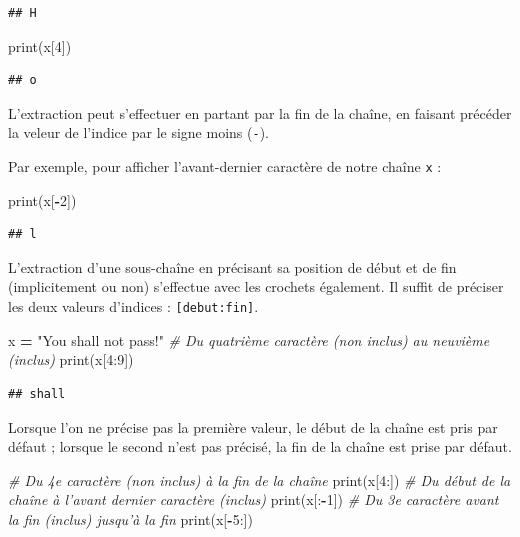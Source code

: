 \documentclass[12pt,]{book}
\newenvironment{Shaded}{\begin{snugshade}}{\end{snugshade}}
\newcommand{\DecValTok}[1]{\textcolor[rgb]{0.00,0.00,0.81}{#1}}
\newcommand{\StringTok}[1]{\textcolor[rgb]{0.31,0.60,0.02}{#1}}
\newcommand{\CommentTok}[1]{\textcolor[rgb]{0.56,0.35,0.01}{\textit{#1}}}
\newcommand{\OperatorTok}[1]{\textcolor[rgb]{0.81,0.36,0.00}{\textbf{#1}}}
\newcommand{\BuiltInTok}[1]{#1}
\newcommand{\NormalTok}[1]{#1}
\numberwithin{equation}{section}
\numberwithin{countremarque}{section}
\begin{document}
\begin{lstlisting}
## H
\end{lstlisting}

\begin{Shaded}
\begin{Highlighting}[]
\BuiltInTok{print}\NormalTok{(x[}\DecValTok{4}\NormalTok{])}
\end{Highlighting}
\end{Shaded}

\begin{lstlisting}
## o
\end{lstlisting}

L'extraction peut s'effectuer en partant par la fin de la chaîne, en
faisant précéder la veleur de l'indice par le signe moins (\texttt{-}).

Par exemple, pour afficher l'avant-dernier caractère de notre chaîne
\texttt{x} :

\begin{Shaded}
\begin{Highlighting}[]
\BuiltInTok{print}\NormalTok{(x[}\OperatorTok{-}\DecValTok{2}\NormalTok{])}
\end{Highlighting}
\end{Shaded}

\begin{lstlisting}
## l
\end{lstlisting}

L'extraction d'une sous-chaîne en précisant sa position de début et de
fin (implicitement ou non) s'effectue avec les crochets également. Il
suffit de préciser les deux valeurs d'indices :
\texttt{{[}debut:fin{]}}.

\begin{Shaded}
\begin{Highlighting}[]
\NormalTok{x }\OperatorTok{=} \StringTok{"You shall not pass!"}
\CommentTok{# Du quatrième caractère (non inclus) au neuvième (inclus)}
\BuiltInTok{print}\NormalTok{(x[}\DecValTok{4}\NormalTok{:}\DecValTok{9}\NormalTok{])}
\end{Highlighting}
\end{Shaded}

\begin{lstlisting}
## shall
\end{lstlisting}

Lorsque l'on ne précise pas la première valeur, le début de la chaîne
est pris par défaut ; lorsque le second n'est pas précisé, la fin de la
chaîne est prise par défaut.

\begin{Shaded}
\begin{Highlighting}[]
\CommentTok{# Du 4e caractère (non inclus) à la fin de la chaîne}
\BuiltInTok{print}\NormalTok{(x[}\DecValTok{4}\NormalTok{:])}
\CommentTok{# Du début de la chaîne à l'avant dernier caractère (inclus)}
\BuiltInTok{print}\NormalTok{(x[:}\OperatorTok{-}\DecValTok{1}\NormalTok{])}
\CommentTok{# Du 3e caractère avant la fin (inclus) jusqu'à la fin}
\BuiltInTok{print}\NormalTok{(x[}\OperatorTok{-}\DecValTok{5}\NormalTok{:])}
\end{Highlighting}
\end{Shaded}
\end{document}
